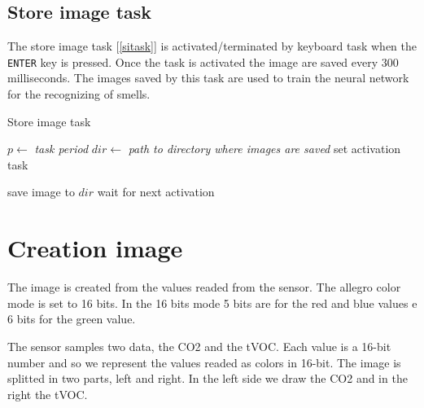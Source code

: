 \documentclass[12pt]{article}
\begin{document}
\subsection{Store image task}
The store image task [\ref{sitask}] is activated/terminated by keyboard task
when the \texttt{ENTER} key is pressed. Once the task is activated the image
are saved every $300$ milliseconds. The images saved by this task are used to
train the neural network for the recognizing of smells.

\begin{algorithm}[t]
\caption{Store image task}
\label{sitask}

\begin{algorithmic}
\State $p\gets$ \textit{task period}
\State $dir\gets$ \textit{path to directory where images are saved}
\State set activation task

\Loop
\State save image to $dir$
\State wait for next activation
\EndLoop

\end{algorithmic}
\end{algorithm}

\section{Creation image}
The image is created from the values readed from the sensor. The allegro color 
mode is set to 16 bits. In the 16 bits mode 5 bits are for the red and blue 
values e 6 bits for the green value. 

The sensor samples two data, the CO2 and the tVOC. Each value is a 16-bit number
and so we represent the values readed as colors in 16-bit. The image is splitted
in two parts, left and right. In the left side we draw the CO2 and in the right 
the tVOC.

\section{}
\end{document}
